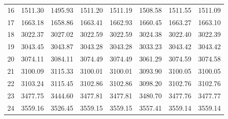 \documentclass[10pt,oneside]{article}
\begin{document}
\begin{table}[h!]
\begin{tabular}{cccccccc}
16 &   1511.30 & 1495.93 & 1511.20 & 1511.19 &      1508.58 & 1511.55 & 1511.09 \\
17 &   1663.18 & 1658.86 & 1663.41 & 1662.93 &      1660.45 & 1663.27 & 1663.10 \\
18 &   3022.37 & 3027.02 & 3022.59 & 3022.59 &      3024.38 & 3022.40 & 3022.39 \\
19 &   3043.45 & 3043.87 & 3043.28 & 3043.28 &      3033.23 & 3043.42 & 3043.42 \\
20 &   3074.11 & 3084.11 & 3074.49 & 3074.49 &      3061.29 & 3074.59 & 3074.58 \\
21 &   3100.09 & 3115.33 & 3100.01 & 3100.01 &      3093.90 & 3100.05 & 3100.05 \\
22 &   3103.24 & 3115.45 & 3102.86 & 3102.86 &      3098.20 & 3102.76 & 3102.76 \\
23 &   3477.75 & 3444.60 & 3477.81 & 3477.81 &      3480.70 & 3477.76 & 3477.77 \\
24 &   3559.16 & 3526.45 & 3559.15 & 3559.15 &      3557.41 & 3559.14 & 3559.14 \\
\bottomrule
\end{tabular}
\end{table}

\clearpage
\end{document}
